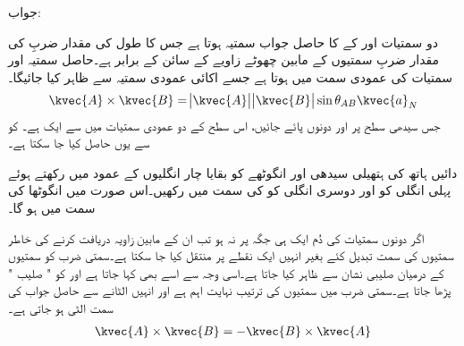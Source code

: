 جواب:

دو سمتیات  اور  کے  کا حاصل جواب سمتیہ ہوتا ہے جس کا طول  کی مقدار ضربِ   کی مقدار ضربِ سمتیوں کے مابین چھوٹے زاویے کے سائن کے برابر ہے۔حاصل سمتیہ  اور  سمتیات کی عمودی سمت  میں ہوتا ہے جسے اکائی عمودی سمتیہ  سے ظاہر کیا جائیگا۔
\begin{align}\label{مساوات_سمتیہ_سمتی_ضرب}
\kvec{A} \times \kvec{B}=\abs{\kvec{A}} \abs{\kvec{B}} \sin \theta_{AB} \kvec{a}_N
\end{align}
جس سیدھی سطح پر  اور  دونوں پائے جائیں،  اس سطح کے دو عمودی سمتیات میں سے ایک ہے۔ کو  سے یوں حاصل کیا جا سکتا ہے۔

دائیں ہاتھ کی ہتھیلی  سیدھی اور انگوٹھے کو بقایا چار انگلیوں کے عمود میں رکھتے ہوئے پہلی انگلی کو  اور  دوسری انگلی کو  کی سمت میں رکھیں۔اس صورت میں انگوٹھا  کی سمت میں ہو گا۔  

اگر دونوں سمتیات کی دُم ایک ہی جگہ پر نہ ہو تب ان کے مابین زاویہ دریافت کرنے کی  خاطر سمتیوں کی سمت تبدیل کئے بغیر انہیں ایک نقطے پر منتقل کیا جا سکتا ہے۔سمتی ضرب کو سمتیوں کے درمیان صلیبی نشان  سے ظاہر کیا جاتا ہے۔اسی وجہ سے اسے  بھی کہا جاتا ہے اور  کو " صلیب " پڑھا جاتا ہے۔سمتی ضرب میں سمتیوں کی ترتیب نہایت اہم ہے اور انہیں الٹانے سے حاصل جواب کی سمت الٹی ہو جاتی ہے۔
\begin{align}\label{مساوات_سمتیہ_صلیبی_ضرب_ترتیب_الٹاتے_منفی_سمت}
\kvec{A} \times \kvec{B}=- \kvec{B} \times \kvec{A}
\end{align}


